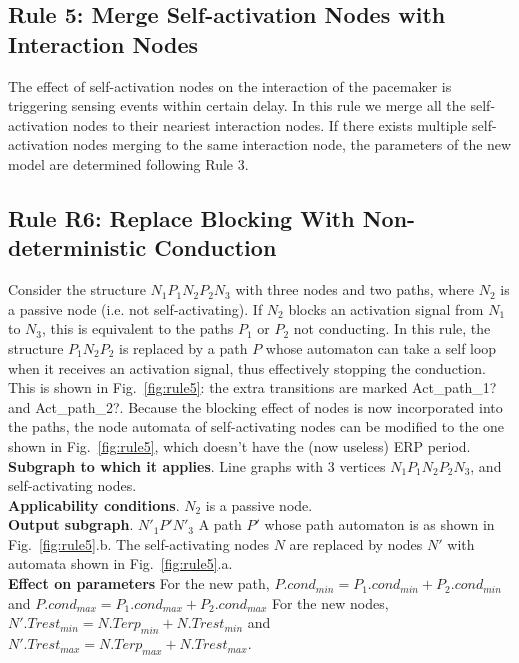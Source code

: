 \subsection{Rule 5: Merge Self-activation Nodes with Interaction Nodes}
The effect of self-activation nodes on the interaction of the pacemaker is triggering sensing events within certain delay. In this rule we merge all the self-activation nodes to their neariest interaction nodes. If there exists multiple self-activation nodes merging to the same interaction node, the parameters of the new model are determined following Rule 3.
\subsection{Rule R6: Replace Blocking With Non-deterministic Conduction}
Consider the structure $N_1 P_1 N_2 P_2 N_3$ with three nodes and two paths, where $N_2$ is a passive node (i.e. not self-activating).
If $N_2$ blocks an activation signal from $N_1$ to $N_3$, this is equivalent to the paths $P_1$ or $P_2$ not conducting.
In this rule, the structure $P_1 N_2 P_2$ is replaced by a path $P$ whose automaton can take a self loop when it receives an activation signal, thus effectively stopping the conduction. 
This is shown in Fig.~\ref{fig:rule5}: the extra transitions are marked Act\_path\_1? and Act\_path\_2?.
Because the blocking effect of nodes is now incorporated into the paths, the node automata of self-activating nodes can be modified to the one shown in Fig.~\ref{fig:rule5}, which doesn't have the (now useless) ERP period.
\\
\textbf{Subgraph to which it applies}.
Line graphs with 3 vertices $N_1 P_1 N_2 P_2 N_3$, and self-activating nodes.\\
\textbf{Applicability conditions}.
$N_2$ is a passive node.\\
\textbf{Output subgraph}.
$N'_1 P' N'_3$
A path $P'$ whose path automaton is as shown in Fig.~\ref{fig:rule5}.b.
The self-activating nodes $N$ are replaced by nodes $N'$ with automata shown in Fig.~\ref{fig:rule5}.a.\\
\textbf{Effect on parameters}
For the new path, $P.cond_{min}=P_1.cond_{min}+P_2.cond_{min}$ and 
$P.cond_{max}=P_1.cond_{max}+P_2.cond_{max}$
For the new nodes, $N'.Trest_{min}=N.Terp_{min}+N.Trest_{min}$ and 
$N'.Trest_{max}=N.Terp_{max}+N.Trest_{max}$.\\
